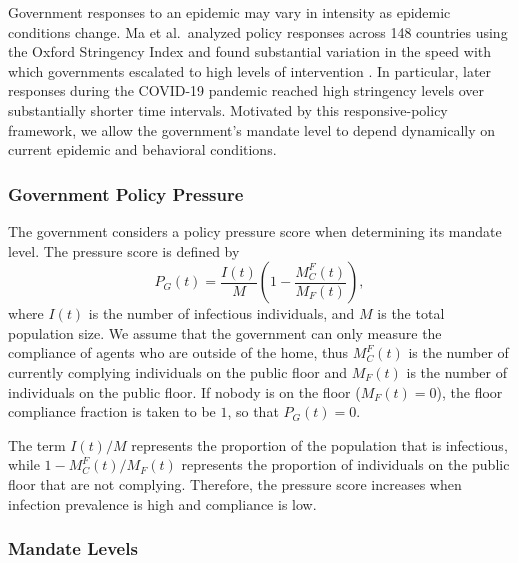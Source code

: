 \documentclass[11pt]{article}
\theoremstyle{definition}
\theoremstyle{plain}
\begin{document}
Government responses to an epidemic may vary in intensity as epidemic
conditions change. Ma et al.\ analyzed policy responses across 148 countries
using the Oxford Stringency Index and found substantial variation in the speed
with which governments escalated to high levels of intervention
\cite{ma2021}. In particular, later responses during the COVID-19 pandemic
reached high stringency levels over substantially shorter time intervals.
Motivated by this responsive-policy framework, we allow the government's
mandate level to depend dynamically on current epidemic and behavioral
conditions.

\subsubsection{Government Policy Pressure}
\label{sec:pressure}

The government considers a policy pressure score when determining its mandate level. The pressure score is defined by
\begin{equation}\label{eq:pressure}
P_G(t)=\frac{I(t)}{M}\left(1-\frac{M_C^F(t)}{M_F(t)}\right),
\end{equation}
where $I(t)$ is the number of infectious individuals, and $M$ is the total population size. We assume that the government can only measure the compliance of agents who are outside of the home, thus $M_C^F(t)$ is the number of currently complying individuals on the public floor and $M_F(t)$ is the number of individuals on the public floor. If nobody is on the floor ($M_F(t)=0$), the floor compliance fraction is taken to be $1$, so that $P_G(t)=0$.

The term $I(t)/M$ represents the proportion of the population that is infectious, while $1-M_C^F(t)/M_F(t)$ represents the proportion of individuals on the public floor that are not complying. Therefore, the pressure score increases when infection prevalence is high and compliance is low.

\subsubsection{Mandate Levels}
\label{sec:mandate}
\end{document}
